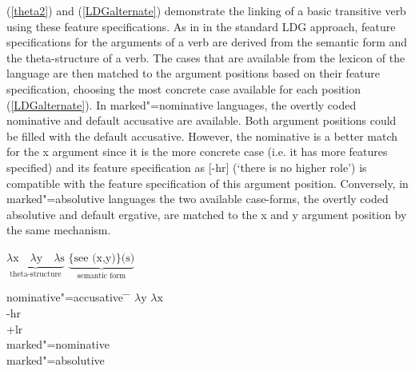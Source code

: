 (\ref{theta2}) and (\ref{LDGalternate}) demonstrate the linking of a basic transitive verb using these feature specifications. 
As in in the standard LDG approach, feature specifications for the arguments of a verb are derived from the semantic form and the theta-structure of a verb.
The cases that are available from the lexicon of the language are then matched to the argument positions based on their feature specification, choosing the most concrete case available for each position (\ref{LDGalternate}). 
In marked"=nominative languages, the overtly coded nominative and default accusative are available. 
Both argument positions could be filled with the default accusative.
However, the nominative is a better match for the x argument since it is the more concrete case (i.e. it has more features specified) and its feature specification as [-hr] (`there is no higher role') is compatible with the feature specification of this argument position. 
Conversely, in marked"=absolutive languages the two available case-forms, the overtly coded absolutive and default ergative, are matched to the x and y argument position by the same mechanism.  


\begin{exe}\ex\label{theta2}
$ \underbrace{ \lambda \text{x} \quad \lambda \text{y} \quad \lambda \text{s}}_{\text{theta-structure}}$ \qquad $ \underbrace{\{ \text{see (x,y)} \} \text{(s)}}_{\text{semantic form}} $ 
\end{exe}

\begin{exe}
\ex\label{LDGalternate}
\begin{tabbing}
nominative"=accusative \quad \= \nom{} \quad \= \kill
{}\>$\lambda \text{y}$ \> $\lambda \text{x}$\\
{} \> {-hr}\\
{} \> {+lr}\\
marked"=nominative\>\acc{}	\> \nom{}\\
marked"=absolutive\>\abs{} \> \erg{}
\end{tabbing}
\end{exe}

